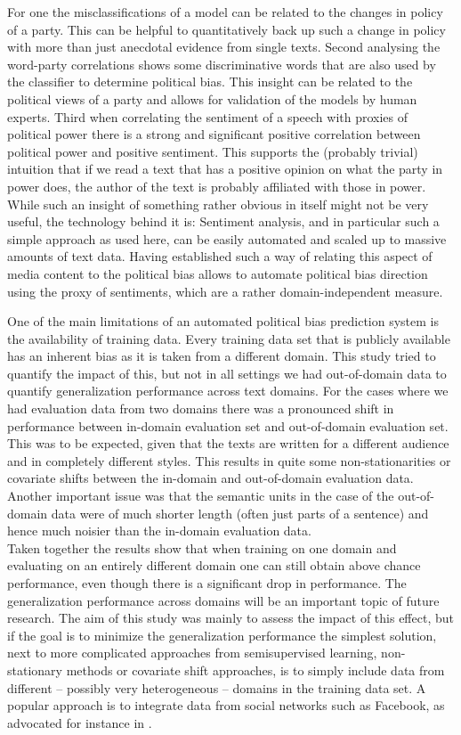 \documentclass[runningheads,a4paper]{llncs}
\begin{document}
For one the misclassifications of a model can be related to the changes in policy of a party. This can be helpful to quantitatively back up such a change in policy with more than just anecdotal evidence from single texts. Second analysing the word-party correlations shows some discriminative words that are also used by the classifier to determine political bias. This insight can be related to the political views of a party and allows for validation of the models by human experts. Third when correlating the sentiment of a speech with proxies of political power there is a strong and significant positive correlation between political power and positive sentiment. This supports the (probably trivial) intuition that if we read a text that has a positive opinion on what the party in power does, the author of the text is probably affiliated with those in power. While such an insight of something rather obvious in itself might not be very useful, the technology behind it is: Sentiment analysis, and in particular such a simple approach as used here, can be easily automated and scaled up to massive amounts of text data. Having established such a way of relating this aspect of media content to the political bias allows to automate political bias direction using the proxy of sentiments, which are a rather domain-independent measure. 

One of the main limitations of an automated political bias prediction system is the availability of training data. Every training data set that is publicly available has an inherent bias as it is taken from a different domain. This study tried to quantify the impact of this, but not in all settings we had out-of-domain data to quantify generalization performance across text domains. 
For the cases where we had evaluation data from two domains there was a pronounced shift in performance between in-domain evaluation set and out-of-domain evaluation set. This was to be expected, given that the texts are written for a different audience and in completely different styles. This results in quite some non-stationarities or covariate shifts between the in-domain and out-of-domain evaluation data. Another important issue was that the semantic units in the case of the out-of-domain data were of much shorter length (often just parts of a sentence) and hence much noisier than the in-domain evaluation data. \\

Taken together the results show that when training on one domain and evaluating on an entirely different domain one can still obtain above chance performance, even though there is a significant drop in performance. The generalization performance across domains will be an important topic of future research. The aim of this study was mainly to assess the impact of this effect, but if the goal is to minimize the generalization performance the simplest solution, next to more complicated approaches from semisupervised learning, non-stationary methods or covariate shift approaches, is to simply include data from different -- possibly very heterogeneous -- domains in the training data set.  A popular approach is to integrate data from social networks such as Facebook, as advocated for instance in \cite{Arzheimer2016}. \\
\end{document}
